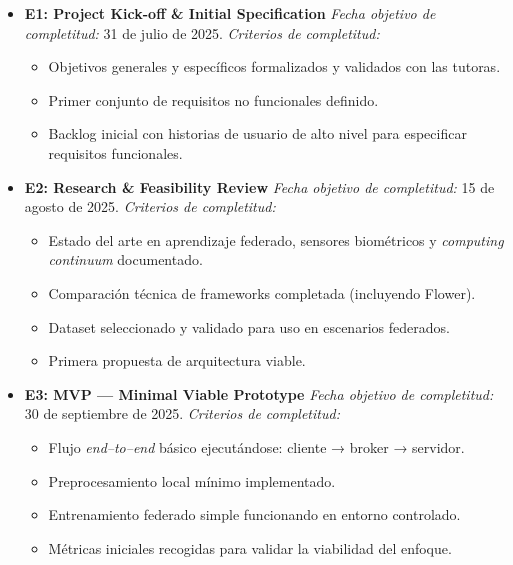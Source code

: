 \documentclass{report}
\begin{document}
\begin{itemize}

    \item \textbf{E1: Project Kick-off \& Initial Specification}  
    \textit{Fecha objetivo de completitud:} 31 de julio de 2025.  
    \textit{Criterios de completitud:}
    \begin{itemize}
        \item Objetivos generales y específicos formalizados y validados con las tutoras.
        \item Primer conjunto de requisitos no funcionales definido.
        \item Backlog inicial con historias de usuario de alto nivel para especificar requisitos funcionales.
    \end{itemize}

    \item \textbf{E2: Research \& Feasibility Review}  
    \textit{Fecha objetivo de completitud:} 15 de agosto de 2025.  
    \textit{Criterios de completitud:}
    \begin{itemize}
        \item Estado del arte en aprendizaje federado, sensores biométricos y \textit{computing continuum} documentado.
        \item Comparación técnica de frameworks completada (incluyendo Flower).
        \item Dataset seleccionado y validado para uso en escenarios federados.
        \item Primera propuesta de arquitectura viable.
    \end{itemize}

    \item \textbf{E3: MVP — Minimal Viable Prototype}  
    \textit{Fecha objetivo de completitud:} 30 de septiembre de 2025.  
    \textit{Criterios de completitud:}
    \begin{itemize}
        \item Flujo \textit{end–to–end} básico ejecutándose: cliente → broker → servidor.
        \item Preprocesamiento local mínimo implementado.
        \item Entrenamiento federado simple funcionando en entorno controlado.
        \item Métricas iniciales recogidas para validar la viabilidad del enfoque.
    \end{itemize}


\end{itemize}
\end{document}
